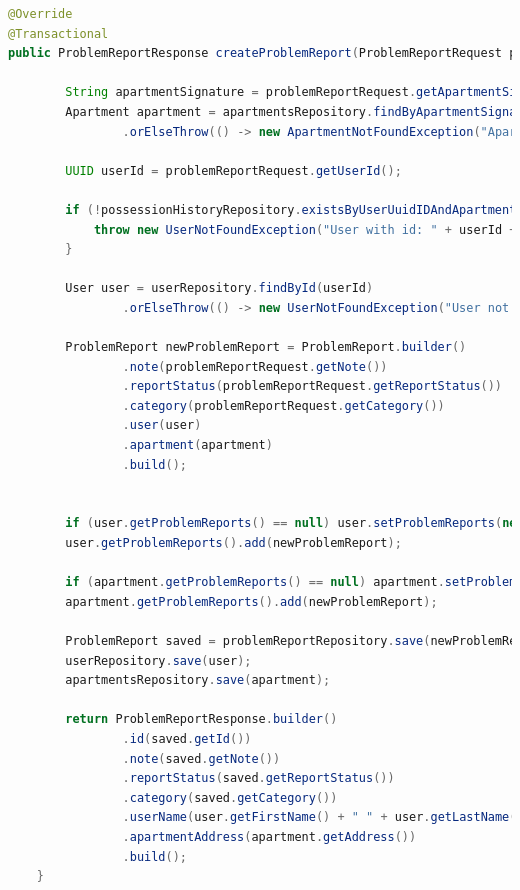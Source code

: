 \begin{lstlisting}[language=Java, caption=Tworzenie zgłoszenia problemu.]
@Override
@Transactional
public ProblemReportResponse createProblemReport(ProblemReportRequest problemReportRequest) throws UserNotFoundException, ApartmentNotFoundException {

        String apartmentSignature = problemReportRequest.getApartmentSignature();
        Apartment apartment = apartmentsRepository.findByApartmentSignature(apartmentSignature)
                .orElseThrow(() -> new ApartmentNotFoundException("Apartment not found with id: " + apartmentSignature));

        UUID userId = problemReportRequest.getUserId();

        if (!possessionHistoryRepository.existsByUserUuidIDAndApartmentUuidID(userId, apartment.getUuidID())) {
            throw new UserNotFoundException("User with id: " + userId + " does not have access to apartment with signature: " + apartmentSignature);
        }

        User user = userRepository.findById(userId)
                .orElseThrow(() -> new UserNotFoundException("User not found with id: " + userId));

        ProblemReport newProblemReport = ProblemReport.builder()
                .note(problemReportRequest.getNote())
                .reportStatus(problemReportRequest.getReportStatus())
                .category(problemReportRequest.getCategory())
                .user(user)
                .apartment(apartment)
                .build();


        if (user.getProblemReports() == null) user.setProblemReports(new ArrayList<>());
        user.getProblemReports().add(newProblemReport);

        if (apartment.getProblemReports() == null) apartment.setProblemReports(new ArrayList<>());
        apartment.getProblemReports().add(newProblemReport);

        ProblemReport saved = problemReportRepository.save(newProblemReport);
        userRepository.save(user);
        apartmentsRepository.save(apartment);

        return ProblemReportResponse.builder()
                .id(saved.getId())
                .note(saved.getNote())
                .reportStatus(saved.getReportStatus())
                .category(saved.getCategory())
                .userName(user.getFirstName() + " " + user.getLastName())
                .apartmentAddress(apartment.getAddress())
                .build();
    }
\end{lstlisting}

